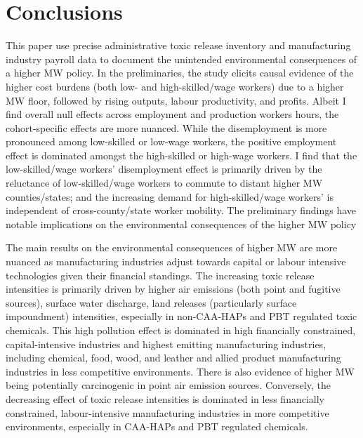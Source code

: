 \documentclass[12pt, english]{article}
\begin{document}
    \section{Conclusions}\label{sec:conclusions}
    This paper use precise administrative toxic release inventory and manufacturing industry payroll data to document the unintended environmental consequences of a higher MW policy. In the preliminaries, the study elicits causal evidence of the higher cost burdens (both low- and high-skilled/wage workers) due to a higher MW floor, followed by rising outputs, labour productivity, and profits. Albeit I find overall null effects across employment and production workers hours, the cohort-specific effects are more nuanced. While the disemployment is more pronounced among low-skilled or low-wage workers, the positive employment effect is dominated amongst the high-skilled or high-wage workers. I find that the low-skilled/wage workers' disemployment effect is primarily driven by the reluctance of low-skilled/wage workers to commute to distant higher MW counties/states; and the increasing demand for high-skilled/wage workers' is independent of cross-county/state worker mobility. The preliminary findings have notable implications on the environmental consequences of the higher MW policy

    The main results on the environmental consequences of higher MW are more nuanced as manufacturing industries adjust towards capital or labour intensive technologies given their financial standings. The increasing toxic release intensities is primarily driven by higher air emissions (both point and fugitive sources), surface water discharge, land releases (particularly surface impoundment) intensities, especially in non-CAA-HAPs and PBT regulated toxic chemicals. This high pollution effect is dominated in high financially constrained, capital-intensive industries and highest emitting manufacturing industries, including chemical, food, wood, and leather and allied product manufacturing industries in less competitive environments. There is also evidence of higher MW being potentially carcinogenic in point air emission sources. Conversely, the decreasing effect of toxic release intensities is dominated in less financially constrained, labour-intensive manufacturing industries in more competitive environments, especially in CAA-HAPs and PBT regulated chemicals.
\end{document}
